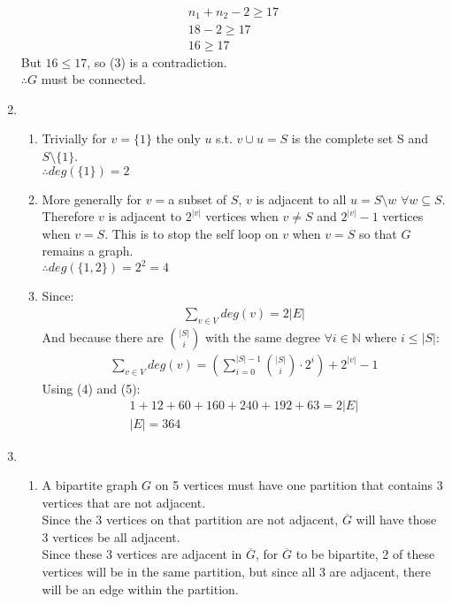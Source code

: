 \documentclass[11pt]{article}
\begin{document}
\begin{enumerate}[]
\begin{gather}
			n_1 + n_2-2 \geq 17 \nonumber \\
			18-2 \geq 17 \nonumber \\
			16 \geq 17
    	\end{gather}
    	But $16 \leq 17$, so (3) is a contradiction.\\
    	$\therefore G$ must be connected.\\
    \item
		\begin{enumerate}[label=\alph*)]
    		\item
   		 		Trivially for $v=\{1\}$ the only $u$ s.t. $v\cup u=S$ is the complete set S and $S\setminus\{1\}$.\\
    			$\therefore deg(\{1\})=2$
    		\item
    			More generally for $v=$a subset of $S$, $v$ is adjacent to all $u=S\setminus w$ $\forall w \subseteq S$.\\
    			Therefore $v$ is adjacent to $2^{|v|}$ vertices when $v\neq S$ and $2^{|v|} -1$ vertices when $v=S$. This is to stop the self loop on $v$ when $v=S$ so that $G$ remains a graph. \\
    			$\therefore deg(\{1,2\}) = 2^2 = 4$
    		\item
    			Since:
    			\begin{gather}
					\sum_{v\in V}deg(v) = 2|E|
    			\end{gather}
    			And because there are $|S| \choose i$ with the same degree $\forall i \in \mathbb{N}$ where $i\leq |S|$:
   			 	\begin{gather}
					\sum_{v\in V}deg(v) = (\sum_{i=0}^{|S|-1} {|S| \choose i}\cdot 2^i) + 2^{|v|} -1
    			\end{gather}
    			Using (4) and (5):
    			\begin{gather}
					1+12+60+160+240+192+63=2|E| \nonumber \\
					|E| = 364 \nonumber
    			\end{gather}
		\end{enumerate}
    \item
		\begin{enumerate}[label=\alph*)]
    		\item 
    			A bipartite graph $G$ on 5 vertices must have one partition that contains 3 vertices that are not adjacent.\\
    			Since the 3 vertices on that partition are not adjacent, $\overline{G}$ will have those 3 vertices be all adjacent.\\
    			Since these 3 vertices are adjacent in $\overline{G}$, for $\overline{G}$ to be bipartite, 2 of these vertices will be in the same partition, but since all 3 are adjacent, there will be an edge within the partition.\\

\end{enumerate}
\end{enumerate}
\end{document}
